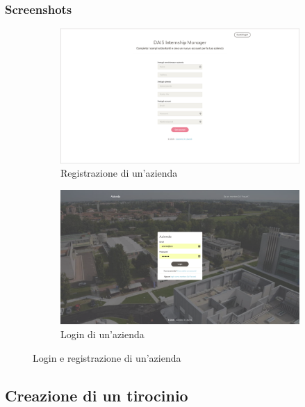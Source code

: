 \subsubsection{Screenshots}
\begin{figure}[H]
	\centering
	\begin{subfigure}[b]{1\textwidth}
		\includegraphics[width=\textwidth]{Figs/screenshots/register}
		\caption{Registrazione di un'azienda}
		\label{fig:screenshot:companyregister}
	\end{subfigure}
	\begin{subfigure}[b]{1\textwidth}
		\includegraphics[width=\textwidth]{Figs/screenshots/login}
		\caption{Login di un'azienda}
		\label{fig:screenshot:companylogin}   
	\end{subfigure}          
	\caption[Screenshot: login e registrazione di un'azienda]{Login e registrazione di un'azienda}
	\label{fig:screenshot:1}
\end{figure}

\pagebreak
\subsection{Creazione  di un tirocinio}


